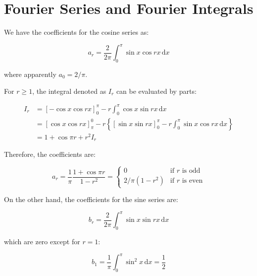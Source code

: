 \documentclass[12pt]{article}
\begin{document}



\pagebreak
\section*{Fourier Series and Fourier Integrals}



We have the coefficients for the cosine series as:

\begin{equation}
    a_{r} = \frac{2}{2\pi} \int_{0}^{\pi} \sin{x} \cos{rx} \, \mathrm{d}x
\end{equation}

where apparently $a_{0} = 2/\pi$.

For $r \ge 1$, the integral denoted as $I_{r}$ can be evaluated by parts:

\begin{equation}
\begin{split}
    I_{r} &= \left[ -\cos{x} \cos{rx} \right]_{0}^{\pi} - r \int_{0}^{\pi} \cos{x} \sin{rx} \, \mathrm{d}x \\
    &= \left[ \cos{x} \cos{rx} \right]_{\pi}^{0} - r \left\{ \left[ \sin{x} \sin{rx} \right]_{0}^{\pi} - r \int_{0}^{\pi} \sin{x} \cos{rx} \, \mathrm{d}x \right\} \\
    &= 1 + \cos{\pi r} + r^{2} I_{r}
\end{split}
\end{equation}

Therefore, the coefficients are:

\begin{equation}
    a_{r} = \frac{1}{\pi} \frac{1 + \cos{\pi r}}{1 - r^{2}} =
    \begin{cases}
        0 & \text{if } r \text{ is odd} \\
        2/\pi(1 - r^{2}) & \text{if } r \text{ is even}
    \end{cases}
\end{equation}

On the other hand, the coefficients for the sine series are:

\begin{equation}
    b_{r} = \frac{2}{2\pi} \int_{0}^{\pi} \sin{x} \sin{rx} \, \mathrm{d}x
\end{equation}

which are zero except for $r = 1$:

\begin{equation}
    b_{1} = \frac{1}{\pi} \int_{0}^{\pi} \sin^{2}{x} \, \mathrm{d}x = \frac{1}{2}
\end{equation}
\end{document}
